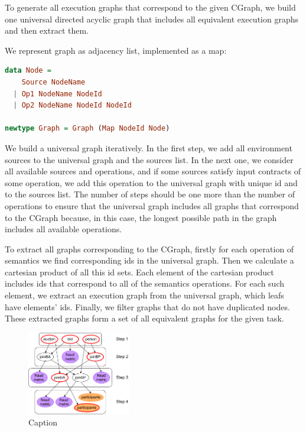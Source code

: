 To generate all execution graphs that correspond to the given CGraph, we build one universal directed acyclic graph that includes all equivalent execution graphs and then extract them.

We represent graph as adjacency list, implemented as a map:

\begin{lstlisting}[language=Haskell]
data Node =
    Source NodeName
  | Op1 NodeName NodeId
  | Op2 NodeName NodeId NodeId

newtype Graph = Graph (Map NodeId Node)
\end{lstlisting}


We build a universal graph iteratively.
In the first step, we add all environment sources to the universal graph and the sources list.
In the next one, we consider all available sources and operations, and if some sources satisfy input contracts of some operation, we add this operation to the universal graph with unique id and to the sources list.
The number of steps should be one more than the number of operations to ensure that the universal graph includes all graphs that correspond to the CGraph because, in this case, the longest possible path in the graph includes all available operations.

To extract all graphs corresponding to the CGraph, firstly for each operation of semantics we find corresponding ids in the universal graph.
Then we calculate a cartesian product of all this id sets.
Each element of the cartesian product includes ids that correspond to all of the semantics operations.
For each such element, we extract an execution graph from the universal graph, which leafs have elements' ids.
Finally, we filter graphs that do not have duplicated nodes.
These extracted graphs form a set of all equivalent graphs for the given task.

\begin{figure}
    \flushright
    \includegraphics[width=0.4\textwidth]{images/generation}
    \caption{Caption}
    \label{fig:gen}
\end{figure}

